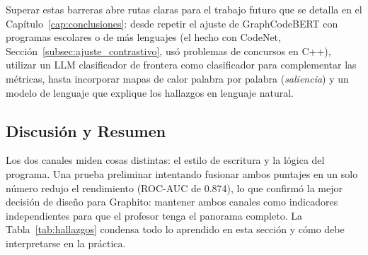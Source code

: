 Superar estas barreras abre rutas claras para el trabajo futuro que se detalla en el Capítulo~\ref{cap:conclusiones}: desde repetir el ajuste de GraphCodeBERT con programas escolares o de más lenguajes (el hecho con CodeNet, Sección~\ref{subsec:ajuste_contrastivo}, usó problemas de concursos en C++), utilizar un LLM clasificador de frontera como clasificador para complementar las métricas, hasta incorporar mapas de calor palabra por palabra (\textit{saliencia}) y un modelo de lenguaje que explique los hallazgos en lenguaje natural.

\subsection{Discusión y Resumen}
\label{subsec:discusion_modelado}

Los dos canales miden cosas distintas: el estilo de escritura y la lógica del programa. Una prueba preliminar intentando fusionar ambos puntajes en un solo número redujo el rendimiento (ROC-AUC de 0.874), lo que confirmó la mejor decisión de diseño para Graphito: mantener ambos canales como indicadores independientes para que el profesor tenga el panorama completo. La Tabla~\ref{tab:hallazgos} condensa todo lo aprendido en esta sección y cómo debe interpretarse en la práctica.

